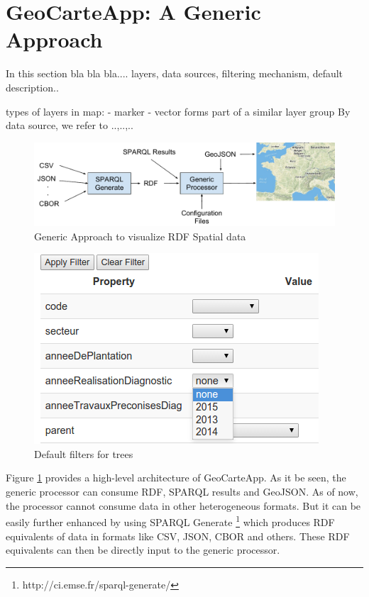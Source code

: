 \documentclass[a4paper,pagenum,english]{rnti}
\begin{document}
\section{GeoCarteApp: A Generic Approach}\label{section:generic}

In this section bla bla bla.... layers, data sources, filtering mechanism, default description..

types of layers in map:
	- marker
	- vector
forms part of a similar layer group	
By data source, we refer to ..,..,..

\begin{figure}
\includegraphics[scale=0.6]{img/generic_approach.pdf}
\caption{Generic Approach to visualize RDF Spatial data}
\label{fig:generic}
\end{figure}

\begin{figure}
\center
\includegraphics[scale=0.5]{img/default_filter.png}
\caption{Default filters for trees}
\label{fig:default_filter}
\end{figure}

Figure \ref{fig:generic} provides a high-level architecture of GeoCarteApp. As it be seen, the generic processor can consume RDF, SPARQL results and GeoJSON. As of now, the processor cannot consume data in other heterogeneous formats. But it can be easily further enhanced by using SPARQL Generate  \footnote{http://ci.emse.fr/sparql-generate/} which produces RDF equivalents of data in formats like CSV, JSON, CBOR and others. These RDF equivalents can then be directly input to the generic processor. 
\end{document}
